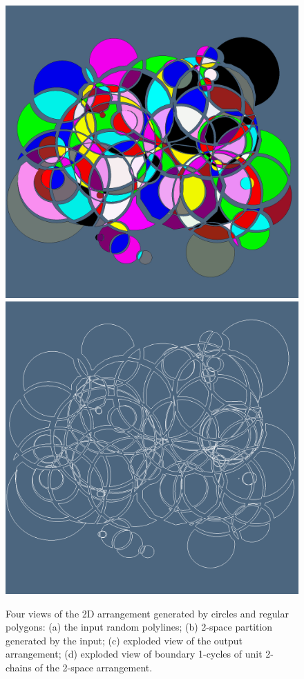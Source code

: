 \documentclass{juliacon}
\begin{document}
\begin{figure}[htbp]
   \includegraphics[width=0.5\linewidth]{figs/bubble3.png}%
   \includegraphics[width=0.5\linewidth]{figs/bubble4.png}%
   \caption{Four views of the 2D arrangement generated by circles and regular polygons:
   (a) the input random polylines; (b) 2-space partition generated by the input; 
   (c) exploded view of the output arrangement; (d) exploded view of boundary 1-cycles of 
   unit 2-chains of the 2-space arrangement.}
   \label{fig:example}
\end{figure}
\end{document}
